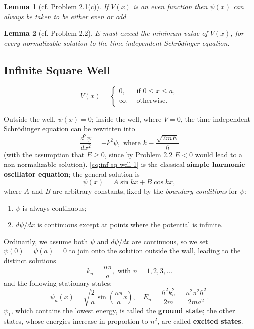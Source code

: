 \documentclass{article}
\newtheorem{lemma}{Lemma}
\begin{document}
\begin{lemma}[cf. Problem 2.1(c)]
  If $V(x)$ is an even function then $\psi(x)$ can always be taken to be either
  even or odd.
\end{lemma}

\begin{lemma}[cf. Problem 2.2]
  $E$ must exceed the minimum value of $V(x)$, for every normalizable solution
  to the time-independent Schr\"{o}dinger equation.
\end{lemma}

\subsection{Infinite Square Well}

\begin{equation} \label{eq:inf-sq-well}
  V(x) =
  \begin{cases}
    0, &\text{ if } 0 \leq x \leq a, \\
    \infty, &\text{ otherwise}.
  \end{cases}
\end{equation}

Outside the well, $\psi(x) = 0$; inside the well, where $V = 0$, the
time-independent Schr\"{o}dinger equation can be rewritten into
\begin{equation} \label{eq:inf-sq-well-1}
  \frac{d^2\psi}{dx^2} = -k^2\psi,
  \text{ where } k \equiv \frac{\sqrt{2mE}}{\hbar}
\end{equation}
(with the assumption that $E \geq 0$, since by Problem 2.2 $E < 0$ would lead
to a non-normalizable solution). \eqref{eq:inf-sq-well-1} is the classical
\textbf{simple harmonic oscillator equation}; the general solution is \[
  \psi(x) = A \sin kx + B \cos kx,
\] where $A$ and $B$ are arbitrary constants, fixed by the \emph{boundary
conditions} for $\psi$:
\begin{enumerate}
  \item $\psi$ is always continuous;
  \item $d\psi/dx$ is continuous except at points where the potential is
    infinite.
\end{enumerate}
Ordinarily, we assume both $\psi$ and $d\psi/dx$ are continuous, so we set
$\psi(0) = \psi(a) = 0$ to join onto the solution outside the wall, leading to
the distinct solutions
\begin{equation} \label{eq:inf-sq-well-2}
  k_n = \frac{n\pi}{a}, \text{ with } n = 1, 2, 3, \ldots
\end{equation}
and the following stationary states:
\begin{equation} \label{eq:inf-sq-well-psi}
  \boxed{
    \psi_n(x) = \sqrt{\frac{2}{a}} \sin\left(\frac{n\pi}{a}x\right),
    \quad E_n = \frac{\hbar^2k_n^2}{2m} = \frac{n^2\pi^2\hbar^2}{2ma^2}.
  }
\end{equation}
$\psi_1$, which contains the lowest energy, is called the \textbf{ground
state}; the other states, whose energies increase in proportion to $n^2$, are
called \textbf{excited states}.
\end{document}
